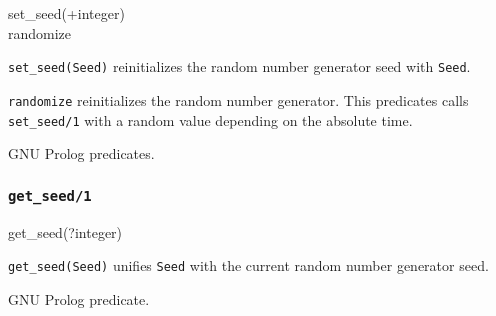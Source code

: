 \begin{TemplatesOneCol}
set\_seed(+integer)\\
randomize

\end{TemplatesOneCol}

\Description

\texttt{set\_seed(Seed)} reinitializes the random number generator seed with
\texttt{Seed}.

\texttt{randomize} reinitializes the random number generator. This
predicates calls \texttt{set\_seed/1} with a random value depending on the
absolute time.

\begin{PlErrors}




\end{PlErrors}

\Portability

GNU Prolog predicates.

\subsubsection{\texttt{get\_seed/1}}

\begin{TemplatesOneCol}
get\_seed(?integer)

\end{TemplatesOneCol}

\Description

\texttt{get\_seed(Seed)} unifies \texttt{Seed} with the current random
number generator seed.

\begin{PlErrors}



\end{PlErrors}

\Portability

GNU Prolog predicate.

